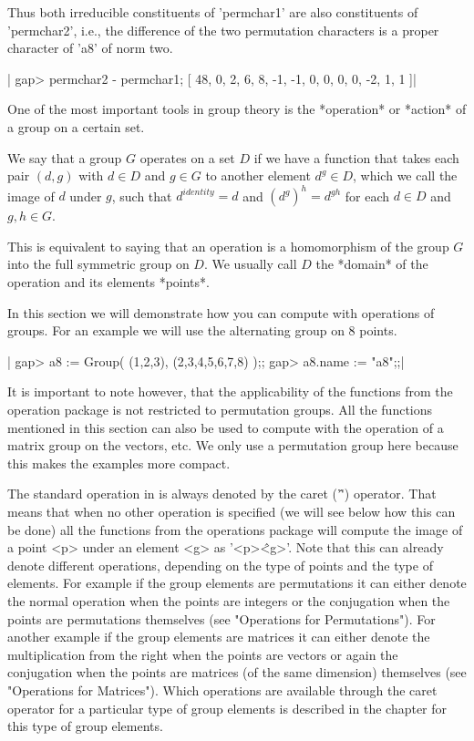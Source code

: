 Thus both irreducible  constituents  of 'permchar1' are also constituents
of 'permchar2', i.e., the difference of the two permutation characters is
a proper character of 'a8' of norm two.

|    gap> permchar2 - permchar1;
    [ 48, 0, 2, 6, 8, -1, -1, 0, 0, 0, 0, -2, 1, 1 ]|


One of the most  important tools in  group  theory is the *operation*  or
*action* of a group on a certain set.

We say that a  group $G$ operates on a set $D$ if we have a function that
takes each pair $(d,g)$ with $d \in  D$ and $g  \in G$ to another element
$d^g  \in  D$, which  we  call  the image of  $d$  under  $g$,  such that
$d^{identity} = d$ and $(d^g)^h = d^{gh}$ for each $d \in D$ and $g,h \in
G$.

This is equivalent to saying that  an operation is  a homomorphism of the
group $G$ into the full symmetric group on $D$.  We  usually call $D$ the
*domain* of the operation and its elements *points*.

In this section  we will demonstrate how you can  compute with operations
of groups.  For an example we will use the alternating group on 8 points.

|    gap> a8 := Group( (1,2,3), (2,3,4,5,6,7,8) );;
    gap> a8.name := "a8";;|

It is important to note however, that the applicability  of the functions
from the operation package is not restricted to  permutation groups.  All
the  functions mentioned in this section can also be used to compute with
the operation of  a  matrix  group on the vectors, etc.   We only  use  a
permutation group here because this makes the examples more compact.

The standard  operation in {\GAP} is always  denoted  by the caret ('\^')
operator.  That means that when no other operation  is specified (we will
see below  how this  can be  done) all the functions from the  operations
package will  compute the image of a point <p>  under  an  element <g> as
'<p>\^<g>'.  Note  that  this  can  already  denote different operations,
depending on the type of points and the type of elements.  For example if
the  group elements  are  permutations it can  either denote  the  normal
operation when the points are integers or the conjugation when the points
are permutations  themselves  (see  "Operations for  Permutations").  For
another  example if the group elements are matrices  it can either denote
the multiplication from  the right  when  the points are vectors or again
the conjugation  when  the  points are  matrices (of the same  dimension)
themselves  (see  "Operations  for  Matrices").    Which  operations  are
available through  the caret  operator  for  a particular  type of  group
elements is described in the chapter for this type of group elements.

